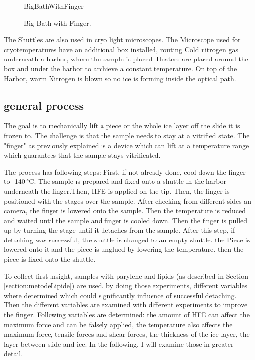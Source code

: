 \begin{figure}[hbt!]
	\centering
	\begin{overpic}[width=7cm,grid]{BigBathWithFinger}
		
	\end{overpic}
	\caption{Big Bath with Finger.}
	\label{fig:GroßesBadMitFinger}
\end{figure}

The Shuttles are also used in cryo light microscopes. The Microscope used for cryotemperatures have an additional box installed, routing Cold nitrogen gas underneath a harbor, where the sample is placed. Heaters are placed around the box and under the harbor to archieve a constant temperature. On top of the Harbor, warm Nitrogen is blown so no ice is forming inside the optical path.

\FloatBarrier

\subsection{general process}

The goal is to mechanically lift a piece or the whole ice layer off the slide it is frozen to. The challenge is that the sample needs to stay at a vitrified state. The "finger" as previously explained is a device which can lift at a temperature range which guarantees that the sample stays vitrificated. 

The process has following steps: First, if not already done, cool down the finger to -140\,°C. The sample is prepared and fixed onto a shuttle in the harbor underneath  the finger.Then, HFE is applied on the tip. Then, the finger is positioned with the stages over the sample. After checking from different sides an camera, the finger is lowered onto the sample. Then the temperature is reduced and waited until the sample and finger is cooled down. Then the finger is pulled up by turning the stage until it detaches from the sample. After this step, if detaching was successful, the shuttle is changed to an empty shuttle. the Piece is lowered onto it and the piece is unglued by lowering the temperature. then the piece is fixed onto the shuttle.

To collect first insight, samples with parylene and lipids (as described in Section \ref{section:metodeLipide}) are used. by doing those experiments, different variables where determined which could significantly influence of successful detaching. Then the different variables are examined with different experiments to improve the finger. Following variables are determined: the amount of HFE can affect the maximum force and can be falsely applied, the temperature also affects the maximum force, tensile forces and shear forces, the thickness of the ice layer, the layer between slide and ice. In the following, I will examine those in greater detail.


